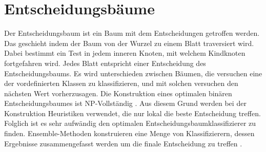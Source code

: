 \chapter{Entscheidungsbäume}
Der Entscheidungsbaum ist ein Baum mit dem Entscheidungen getroffen werden. Das geschieht indem der Baum von der Wurzel zu einem Blatt traversiert wird. Dabei bestimmt ein Test in jedem inneren Knoten,
mit welchem Kindknoten fortgefahren wird. Jedes Blatt entspricht einer Entscheidung des Entscheidungsbaums. Es wird unterschieden zwischen Bäumen, die versuchen eine der vordefinierten Klassen zu klassifizieren,
und mit solchen versuchen den nächsten Wert vorherzusagen.
\newline
\newline
Die Konstruktion eines optimalen binären Entscheidungsbaumes ist NP-Vollständig \cite{laurent1976constructing}. Aus diesem Grund werden bei der Konstruktion
Heuristiken verwendet, die nur lokal die beste Entscheidung treffen. Folglich ist es sehr aufwändig den optimalen Entscheidungsbaumklassifizierer zu finden. Ensemble-Methoden konstruieren eine Menge von
Klassifizierern, dessen Ergebnisse zusammengefasst werden um die finale Entscheidung zu treffen \cite{dietterich2002ensemble}.

